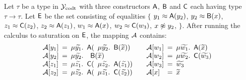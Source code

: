 \begin{example}
Let $\tau$ be a type in $\mathcal{Y}_{\mathrm{codt}}$ with three constructors $\textsf{A}$, $\textsf{B}$ and $\textsf{C}$ each having type $\tau \rightarrow \tau$.
Let $\mathsf{E}$ be the set consisting of equalities
$\{$
$y_1 \approx \textsf{A}( y_2 )$,
$y_2 \approx \textsf{B}( x )$,
$z_1 \approx \textsf{C}( z_2 )$,
$z_2 \approx \textsf{A}( z_1 )$,
$w_1 \approx \textsf{A}( x )$,
$w_2 \approx \textsf{C}( w_3 )$,
$x \not\approx y_2$,
$\}$.
After running the calculus to saturation on $\mathsf{E}$, the mapping $\mathcal{A}$ contains:
\[\begin{array}{l@{\hspace{.5em}}l@{\hspace{.5em}}l@{\hspace{.5em}}l@{\hspace{.5em}}l@{\hspace{.5em}}l@{\hspace{2.0em}}l@{\hspace{.5em}}l@{\hspace{.5em}}l@{\hspace{.5em}}l@{\hspace{.5em}}l@{\hspace{.5em}}l@{\hspace{.5em}}l}
\Val \ec{y_1} & = & \mu {\Varec{y_1}}. & \const{A}( & \mu {\Varec{y_2}}. & \const{B}( {\Varec{x}} ) ) &
\Val \ec{w_1} & = & \mu {\Varec{w_1}}. & \const{A}( {\Varec{x}} )      & \\ 
\Val \ec{y_2} & = & \mu {\Varec{y_2}}. & \multicolumn{2}{l}{\const{B}( {\Varec{x}} )}      & &
\Val \ec{w_2} & = & \mu {\Varec{w_2}}. & \const{C}( {\Varec{w_3}} ) \\
\Val \ec{z_1} & = & \mu {\Varec{z_1}}. & \const{C}( & \mu {\Varec{z_2}}. & \const{A}( {\Varec{z_1}} ) ) &
\Val \ec{w_3} & = & {\Varec{w_3}} \\
\Val \ec{z_2} & = & \mu {\Varec{z_2}}. & \const{A}( & \mu {\Varec{z_1}}. & \const{C}( {\Varec{z_2}} ) ) & 
\Val \ec{x} & = & {\Varec{x}} \\
\end{array}\]


\end{example}
